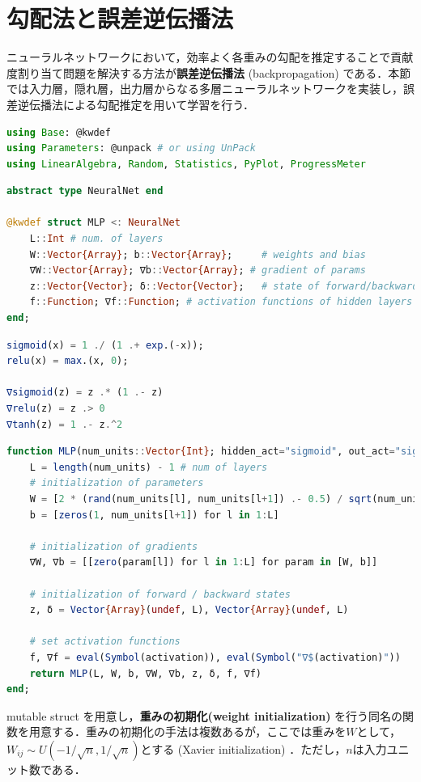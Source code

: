 \section{勾配法と誤差逆伝播法}
ニューラルネットワークにおいて，効率よく各重みの勾配を推定することで貢献度割り当て問題を解決する方法が\textbf{誤差逆伝播法} (backpropagation) である．本節では入力層，隠れ層，出力層からなる多層ニューラルネットワークを実装し，誤差逆伝播法による勾配推定を用いて学習を行う．
\begin{lstlisting}[language=julia]
using Base: @kwdef
using Parameters: @unpack # or using UnPack
using LinearAlgebra, Random, Statistics, PyPlot, ProgressMeter
\end{lstlisting}
\begin{lstlisting}[language=julia]
abstract type NeuralNet end

@kwdef struct MLP <: NeuralNet
    L::Int # num. of layers
    W::Vector{Array}; b::Vector{Array};     # weights and bias
    ∇W::Vector{Array}; ∇b::Vector{Array}; # gradient of params
    z::Vector{Vector}; δ::Vector{Vector};   # state of forward/backward activity
    f::Function; ∇f::Function; # activation functions of hidden layers
end;
\end{lstlisting}
\begin{lstlisting}[language=julia]
sigmoid(x) = 1 ./ (1 .+ exp.(-x));
relu(x) = max.(x, 0);

∇sigmoid(z) = z .* (1 .- z)
∇relu(z) = z .> 0
∇tanh(z) = 1 .- z.^2
\end{lstlisting}
\begin{lstlisting}[language=julia]
function MLP(num_units::Vector{Int}; hidden_act="sigmoid", out_act="sigmoid")
    L = length(num_units) - 1 # num of layers
    # initialization of parameters
    W = [2 * (rand(num_units[l], num_units[l+1]) .- 0.5) / sqrt(num_units[l]) for l in 1:L]
    b = [zeros(1, num_units[l+1]) for l in 1:L]
    
    # initialization of gradients
    ∇W, ∇b = [[zero(param[l]) for l in 1:L] for param in [W, b]]
    
    # initialization of forward / backward states
    z, δ = Vector{Array}(undef, L), Vector{Array}(undef, L)
    
    # set activation functions
    f, ∇f = eval(Symbol(activation)), eval(Symbol("∇$(activation)"))
    return MLP(L, W, b, ∇W, ∇b, z, δ, f, ∇f)
end;
\end{lstlisting}
mutable struct を用意し，\textbf{重みの初期化(weight initialization)} を行う同名の関数を用意する．重みの初期化の手法は複数あるが，ここでは重みを$W$として，$W_{ij} \sim U\left(-1/\sqrt{n}, 1/\sqrt{n}\right)$とする (Xavier initialization) \citep{Glorot2010-iu}．ただし，$n$は入力ユニット数である．
